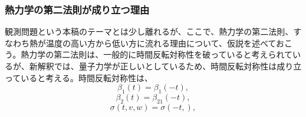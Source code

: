 \subsubsection{熱力学の第二法則が成り立つ理由}
観測問題という本稿のテーマとは少し離れるが、ここで、熱力学の第二法則、すなわち熱が温度の高い方から低い方に流れる理由について、仮説を述べておこう。熱力学の第二法則は、一般的に時間反転対称性を破っていると考えられているが、新解釈では、量子力学が正しいとしているため、時間反転対称性は成り立っていると考える。時間反転対称性は、
\begin{equation}
    \beta_1(t) = \beta_1(-t),
\end{equation}
\begin{equation}
    \beta_2(t) = \beta_21(-t),
\end{equation}
\begin{equation}
    \sigma(t,v,w) = \sigma(-t,),
\end{equation}

